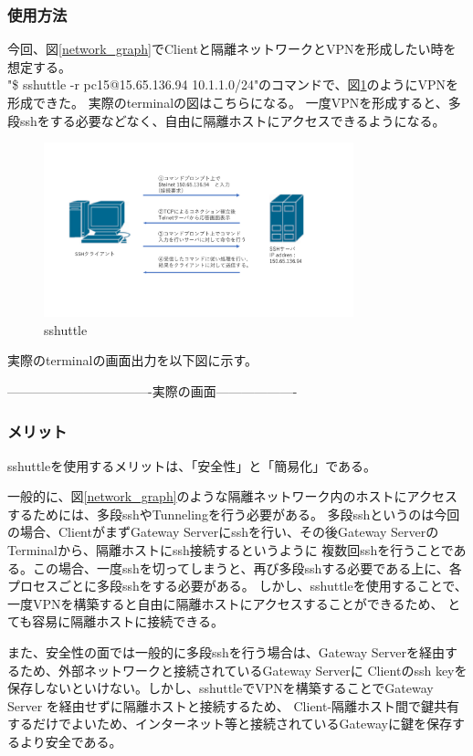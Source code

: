 \documentclass[12pt,a4paper,titlepage]{jsarticle}
\begin{document}
\subsubsection*{使用方法}
今回、図\ref{network_graph}でClientと隔離ネットワークとVPNを形成したい時を想定する。\\
"\$ sshuttle -r pc15@15.65.136.94 10.1.1.0/24"のコマンドで、図\ref{sshuttle}のようにVPNを形成できた。
実際のterminalの図はこちらになる。
一度VPNを形成すると、多段sshをする必要などなく、自由に隔離ホストにアクセスできるようになる。



\begin{figure}[h]
    \centering
    \includegraphics[width=0.8\textwidth, page=7]{graphs/network_archtecture.pdf}
    \caption{sshuttle}
    \label{sshuttle}
\end{figure}
実際のterminalの画面出力を以下図に示す。

----------------------------------実際の画面-------------------



\subsubsection*{メリット}
sshuttleを使用するメリットは、「安全性」と「簡易化」である。\par
一般的に、図\ref{network_graph}のような隔離ネットワーク内のホストにアクセスするためには、多段sshやTunnelingを行う必要がある。
多段sshというのは今回の場合、ClientがまずGateway Serverにsshを行い、その後Gateway ServerのTerminalから、隔離ホストにssh接続するというように
複数回sshを行うことである。この場合、一度sshを切ってしまうと、再び多段sshする必要である上に、各プロセスごとに多段sshをする必要がある。
しかし、sshuttleを使用することで、一度VPNを構築すると自由に隔離ホストにアクセスすることができるため、
とても容易に隔離ホストに接続できる。\par
また、安全性の面では一般的に多段sshを行う場合は、Gateway Serverを経由するため、外部ネットワークと接続されているGateway Serverに
Clientのssh keyを保存しないといけない。しかし、sshuttleでVPNを構築することでGateway Server を経由せずに隔離ホストと接続するため、
Client-隔離ホスト間で鍵共有するだけでよいため、インターネット等と接続されているGatewayに鍵を保存するより安全である。
\end{document}
